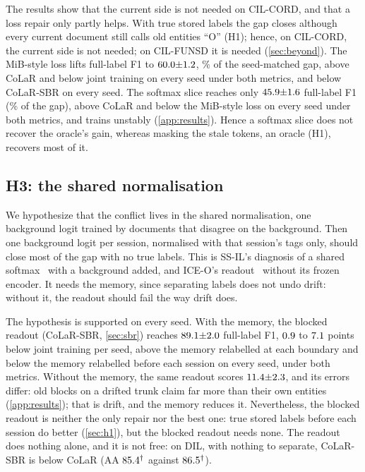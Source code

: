 \documentclass[10pt,twocolumn,letterpaper]{article}
\begin{document}
The results show that the current side is not needed on CIL-CORD, and that a loss repair only partly helps. With true stored labels the gap closes although every current document still calls old entities ``O'' (H1); hence, on CIL-CORD, the current side is not needed; on CIL-FUNSD it is needed (\cref{sec:beyond}). The MiB-style loss lifts full-label F1 to $60.0{\pm}1.2$, \nMibShareFull\% of the seed-matched gap, above CoLaR and below joint training on every seed under both metrics, and below CoLaR-SBR on every seed. The softmax slice reaches only $45.9{\pm}1.6$ full-label F1 (\nSlicedShareFull\% of the gap), above CoLaR and below the MiB-style loss on every seed under both metrics, and trains unstably (\cref{app:results}). Hence a softmax slice does not recover the oracle's gain, whereas masking the stale tokens, an oracle (H1), recovers most of it.

\subsection{H3: the shared normalisation}
\label{sec:h3}
We hypothesize that the conflict lives in the shared normalisation, one background logit trained by documents that disagree on the background. Then one background logit per session, normalised with that session's tags only, should close most of the gap with no true labels. This is SS-IL's diagnosis of a shared softmax~\citep{ahn2021ssil} with a background added, and ICE-O's readout~\citep{liu2023ice} without its frozen encoder. It needs the memory, since separating labels does not undo drift: without it, the readout should fail the way drift does.

The hypothesis is supported on every seed. With the memory, the blocked readout (CoLaR-SBR, \cref{sec:sbr}) reaches $89.1{\pm}2.0$ full-label F1, $0.9$ to $7.1$ points below joint training per seed, above the memory relabelled at each boundary and below the memory relabelled before each session on every seed, under both metrics. Without the memory, the same readout scores $11.4{\pm}2.3$, and its errors differ: old blocks on a drifted trunk claim far more than their own entities (\cref{app:results}); that is drift, and the memory reduces it. Nevertheless, the blocked readout is neither the only repair nor the best one: true stored labels before each session do better (\cref{sec:h1}), but the blocked readout needs none. The readout does nothing alone, and it is not free: on DIL, with nothing to separate, CoLaR-SBR is below CoLaR (AA $85.4^\dagger$ against $86.5^\dagger$).
\end{document}
